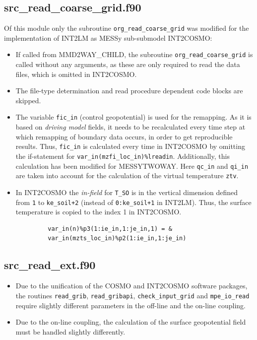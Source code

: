 \documentclass[11pt,twoside]{article}
\begin{document}
\subsection{src\_read\_coarse\_grid.f90}\label{sec:tech_readcoarsegrid}
Of this module only the subroutine \verb|org_read_coarse_grid| was modified for 
the implementation of INT2LM as MESSy sub-submodel INT2COSMO:
\begin{itemize}
\item If called from MMD2WAY\_CHILD, the subroutine \verb|org_read_coarse_grid| is 
called without any arguments, as these are only required to read the data files,
which is omitted in INT2COSMO.
\item  The file-type determination and read procedure
dependent code blocks are skipped.
\item The variable \verb|fic_in| (control geopotential) is used for the 
      remapping. As it is based on {\it driving model} fields, it needs
      to be recalculated every time step at which remapping of boundary data
      occurs, in order to get reproducible results.
      Thus, \verb|fic_in| is calculated every time in INT2COSMO
      by omitting the if-statement
      for \verb|var_in(mzfi_loc_in)%lreadin|.
      Additionally, this calculation has been modified for
      MESSYTWOWAY. Here \verb|qc_in| and \verb|qi_in| are taken into
      account for the calculation of the virtual temperature \verb|ztv|.
      
\item In INT2COSMO the {\it in-field} for \verb|T_SO| is 
      in the vertical dimension defined from \verb|1| to \verb|ke_soil+2|
      (instead of \verb|0:ke_soil+1| in INT2LM). 
      Thus, the surface temperature is copied to the index 1 in INT2COSMO.
\begin{verbatim}
         var_in(n)%p3(1:ie_in,1:je_in,1) = &
         var_in(mzts_loc_in)%p2(1:ie_in,1:je_in)
\end{verbatim}
\end{itemize}
\subsection{src\_read\_ext.f90}
\begin{itemize}
\item Due to the unification of the COSMO and INT2COSMO software
packages, the routines \verb|read_grib|, \verb|read_gribapi|, 
\verb|check_input_grid| and  \verb|mpe_io_read|
require slightly different parameters in the off-line and the on-line
coupling.
\item Due to the on-line coupling, the calculation of the surface
geopotential field must be handled slightly differently.
\end{itemize}
\end{document}
